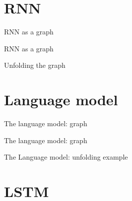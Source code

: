 \documentclass[10pt]{beamer}
\begin{document}
\nocite{DeepLearningbook}


\maketitle



\section{RNN}

\begin{frame}{RNN as a graph}

\end{frame}

\begin{frame}{RNN as a graph}

\end{frame}

\begin{frame}{Unfolding the graph}

\end{frame}

%

%

\section{Language model}

\begin{frame}{The language model: graph}

\end{frame}

\begin{frame}{The language model: graph}

\end{frame}

\begin{frame}{The Language model: unfolding example}

\end{frame}

\section{LSTM}
\end{document}
